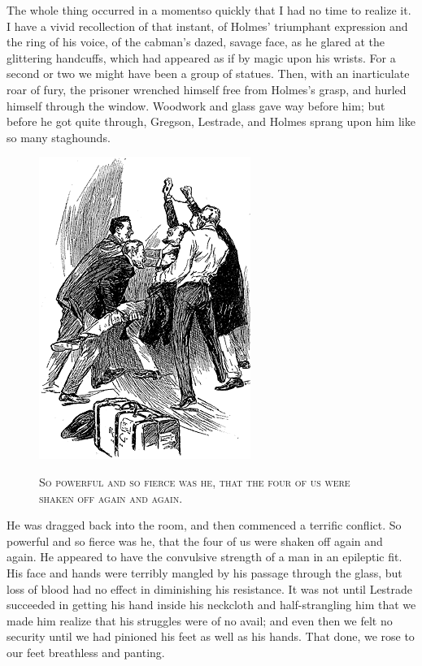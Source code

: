 \documentclass[12pt,english]{book}
\newcommand{\noun}[1]{\textsc{#1}}
\begin{document}
The whole thing occurred in a moment\mdsh{---}so quickly that I had
no time to realize it. I have a vivid recollection of that instant,
of Holmes' triumphant expression and the ring of his voice, of the
cabman's dazed, savage face, as he glared at the glittering handcuffs,
which had appeared as if by magic upon his wrists. For a second or
two we might have been a group of statues. Then, with an inarticulate
roar of fury, the prisoner wrenched himself free from Holmes's grasp,
and hurled himself through the window. Woodwork and glass gave way
before him; but before he got quite through, Gregson, Lestrade, and
Holmes sprang upon him like so many staghounds. %
\begin{figure}[htbp]
\noindent \begin{center}\includegraphics{images/study10-stud-13.png}\end{center}

\noindent \begin{center}\noun{So powerful and so fierce was he,
that the four of us were shaken off again and again.}\end{center}
\end{figure}
He was dragged back into the room, and then commenced a terrific conflict.
So powerful and so fierce was he, that the four of us were shaken
off again and again. He appeared to have the convulsive strength of
a man in an epileptic fit. His face and hands were terribly mangled
by his passage through the glass, but loss of blood had no effect
in diminishing his resistance. It was not until Lestrade succeeded
in getting his hand inside his neckcloth and half-strangling him that
we made him realize that his struggles were of no avail; and even
then we felt no security until we had pinioned his feet as well as
his hands. That done, we rose to our feet breathless and panting.
\end{document}
